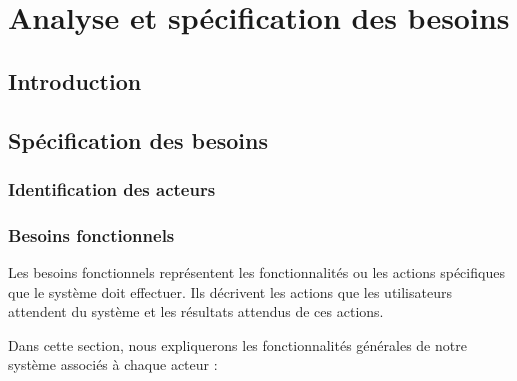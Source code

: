 
\chapter{Analyse et spécification des besoins}
\label{chap:deuxiemechapitre}

\section{Introduction}

\raggedbottom

\section{Spécification des besoins}

\vspace{5mm}
\subsection{Identification des acteurs}
\vspace{5mm}

\vspace{3mm}

\subsection{Besoins fonctionnels}
\vspace{5mm}
Les besoins fonctionnels représentent les fonctionnalités ou les actions spécifiques que le système doit
effectuer. Ils décrivent les actions que les utilisateurs attendent du système et les résultats attendus de
ces actions.
\par
\vspace{2mm}
Dans cette section, nous expliquerons les fonctionnalités générales de notre système associés à chaque acteur :
\vspace{8mm}

